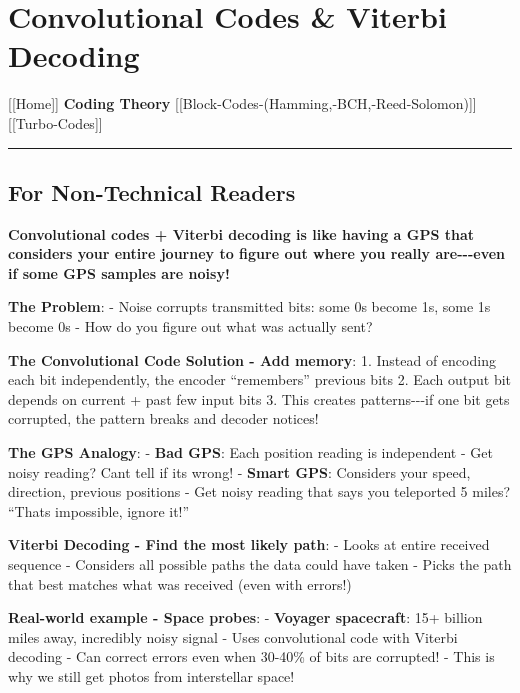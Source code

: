 \section{Convolutional Codes \& Viterbi
Decoding}\label{convolutional-codes-viterbi-decoding}

{[}{[}Home{]}{]} \textbar{} \textbf{Coding Theory} \textbar{}
{[}{[}Block-Codes-(Hamming,-BCH,-Reed-Solomon){]}{]} \textbar{}
{[}{[}Turbo-Codes{]}{]}

\begin{center}\rule{0.5\linewidth}{0.5pt}\end{center}

\subsection{\texorpdfstring{ For Non-Technical
Readers}{ For Non-Technical Readers}}\label{for-non-technical-readers}

\textbf{Convolutional codes + Viterbi decoding is like having a GPS that
considers your entire journey to figure out where you really
are-\/-\/-even if some GPS samples are noisy!}

\textbf{The Problem}: - Noise corrupts transmitted bits: some 0s become
1s, some 1s become 0s - How do you figure out what was actually sent?

\textbf{The Convolutional Code Solution - Add memory}: 1. Instead of
encoding each bit independently, the encoder ``remembers'' previous bits
2. Each output bit depends on current + past few input bits 3. This
creates patterns-\/-\/-if one bit gets corrupted, the pattern breaks and
decoder notices!

\textbf{The GPS Analogy}: - \textbf{Bad GPS}: Each position reading is
independent - Get noisy reading? Can\textquotesingle t tell if
it\textquotesingle s wrong! - \textbf{Smart GPS}: Considers your speed,
direction, previous positions - Get noisy reading that says you
teleported 5 miles? ``That\textquotesingle s impossible, ignore it!''

\textbf{Viterbi Decoding - Find the most likely path}: - Looks at entire
received sequence - Considers all possible paths the data could have
taken - Picks the path that best matches what was received (even with
errors!)

\textbf{Real-world example - Space probes}: - \textbf{Voyager
spacecraft}: 15+ billion miles away, incredibly noisy signal - Uses
convolutional code with Viterbi decoding - Can correct errors even when
30-40\% of bits are corrupted! - This is why we still get photos from
interstellar space!


